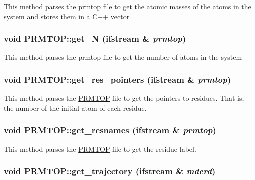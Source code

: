 \label{classPRMTOP_a4861564abec2a2b093edb25f5a6e1d56}
This method parses the prmtop file to get the atomic masses of the atoms in the system and stores them in a C++ vector \hypertarget{classPRMTOP_acc2429d80ed7fa556e7b47a12cfaab41}{
\subsubsection[{get\_\-N}]{\setlength{\rightskip}{0pt plus 5cm}void PRMTOP::get\_\-N (ifstream \& {\em prmtop})}}
\label{classPRMTOP_acc2429d80ed7fa556e7b47a12cfaab41}
This method parses the prmtop file to get the number of atoms in the system \hypertarget{classPRMTOP_a0548d72491a07082eada2260447d0124}{
\subsubsection[{get\_\-res\_\-pointers}]{\setlength{\rightskip}{0pt plus 5cm}void PRMTOP::get\_\-res\_\-pointers (ifstream \& {\em prmtop})}}
\label{classPRMTOP_a0548d72491a07082eada2260447d0124}
This method parses the \hyperlink{classPRMTOP}{PRMTOP} file to get the pointers to residues. That is, the number of the initial atom of each residue. \hypertarget{classPRMTOP_a75e8519cbcddb63eab50a3372371f51b}{
\subsubsection[{get\_\-resnames}]{\setlength{\rightskip}{0pt plus 5cm}void PRMTOP::get\_\-resnames (ifstream \& {\em prmtop})}}
\label{classPRMTOP_a75e8519cbcddb63eab50a3372371f51b}
This method parses the \hyperlink{classPRMTOP}{PRMTOP} file to get the residue label. \hypertarget{classPRMTOP_ad887581ff384f7c8cc7d3cf4e3d19b58}{
\subsubsection[{get\_\-trajectory}]{\setlength{\rightskip}{0pt plus 5cm}void PRMTOP::get\_\-trajectory (ifstream \& {\em mdcrd})}}
\label{classPRMTOP_ad887581ff384f7c8cc7d3cf4e3d19b58}

